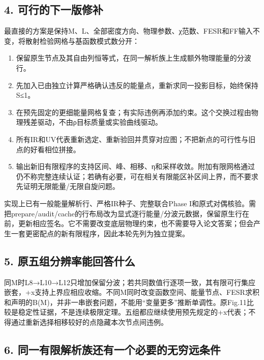 \documentclass[
  11pt,
  a4paper,
]{article}
\providecommand{\tightlist}{%
  \setlength{\itemsep}{0pt}\setlength{\parskip}{0pt}}
\begin{document}
\subsection{4.
可行的下一版修补}\label{ux53efux884cux7684ux4e0bux4e00ux7248ux4feeux8865}

最直接的方案是保持M、L、全部密度方向、物理参数、χ范数、FESR和FF输入不变，将散射检验网格与基函数模式数分开：

\begin{enumerate}
\def\labelenumi{\arabic{enumi}.}
\tightlist
\item
  保留原生节点及其自由列恒等式，在同一解析族上生成额外物理能量的分波行。
\item
  先加入已由独立计算严格确认违反的能量点，重新求同一投影目标，始终保持\textbar S\textbar≤1。
\item
  在预先固定的更细能量网格复查；有实际违例再添加约束。这个交换过程由物理残差驱动，不由ρ目标质量或实验曲线驱动。
\item
  所有IR和UV代表重新选定、重新验回并贯穿对应图；不把新点的可行性与旧点的好看相位拼接。
\item
  输出新旧有限程序的支持区间、峰、相移、η和采样收敛。附加有限网格通过仍不称完整连续认证；若确有必要，可在相关有限能区补区间上界，而不要求先证明无限能量/无限自旋问题。
\end{enumerate}

实现上已有一般能量解析行、严格IR种子、完整联合Phase
I和原式对偶核验。需把prepare/audit/cache的行布局改为显式逐行能量/分波元数据，保留原生行在前，更新相应签名。它不需要改变底层物理约束，也不需要导入论文答案；但会产生一套更密配点的新有限程序，因此本轮先列为独立提案。

\subsection{5.
原五组分辨率能回答什么}\label{ux539fux4e94ux7ec4ux5206ux8fa8ux7387ux80fdux56deux7b54ux4ec0ux4e48}

同M时L8→L10→L12只增加保留分波；若共同数值行逐项一致，其有限可行集应嵌套，+x支持上界应相应收缩。不同M同时改变函数空间、能量节点、FESR求积和声明的B(M)，并非一串嵌套问题，不能用``变量更多''推断单调性。原Fig.11比较是稳定性证据，不是连续极限定理。五组都应继续使用预先规定的+x代表；不得通过重新选择相移较好的点隐藏本次节点间违例。

\subsection{6.
同一有限解析族还有一个必要的无穷远条件}\label{ux540cux4e00ux6709ux9650ux89e3ux6790ux65cfux8fd8ux6709ux4e00ux4e2aux5fc5ux8981ux7684ux65e0ux7a77ux8fdcux6761ux4ef6}
\end{document}
